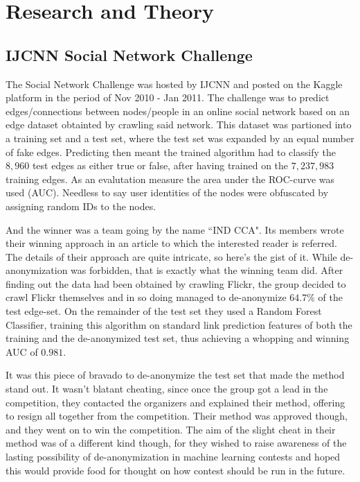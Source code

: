 \documentclass{llncs}
\begin{document}
\section{Research and Theory}
\subsection{IJCNN Social Network Challenge}
The Social Network Challenge was hosted by IJCNN and posted on the Kaggle platform in the period of Nov 2010 - Jan 2011. The challenge was to predict edges/connections between nodes/people in an online social network based on an edge dataset obtainted by crawling said network. This dataset was partioned into a training set and a test set, where the test set was expanded by an equal number of fake edges. Predicting then meant the trained algorithm had to classify the $8,960$ test edges as either true or false, after having trained on the $7,237,983$ training edges. As an evalutation measure the area under the ROC-curve was used (AUC). Needless to say user identities of the nodes were obfuscated by assigning random IDs to the nodes.

And the winner was a team going by the name ``IND CCA". Its members wrote their winning approach in an article \cite{6033446} to which the interested reader is referred. The details of their approach are quite intricate, so here's the gist of it. While de-anonymization was forbidden, that is exactly what the winning team did. After finding out the data had been obtained by crawling Flickr, the group decided to crawl Flickr themselves and in so doing managed to de-anonymize $64.7 \%$ of the test edge-set. On the remainder of the test set they used a Random Forest Classifier, training this algorithm on standard link prediction features of both the training and the de-anonymized test set, thus achieving a whopping and winning AUC of $0.981$.

It was this piece of bravado to de-anonymize the test set that made the method stand out. It wasn't blatant cheating, since once the group got a lead in the competition, they contacted the organizers and explained their method, offering to resign all together from the competition. Their method was approved though, and they went on to win the competition. The aim of the slight cheat in their method was of a different kind though, for they wished to raise awareness of the lasting possibility of de-anonymization in machine learning contests and hoped this would provide food for thought on how contest should be run in the future.
\end{document}

